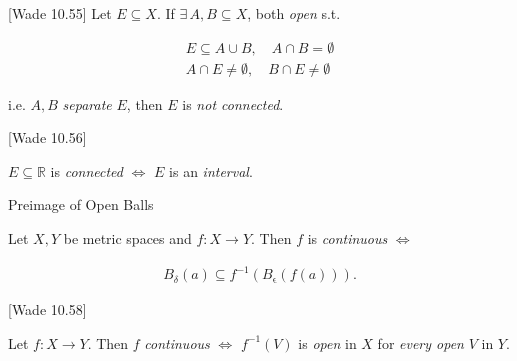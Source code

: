 \documentclass[10pt]{article} %
\newcommand{\cw}[1]{[Wade #1]}
\begin{document}
\begin{multicols}{3}
\begin{remark}{\cw{10.55}}{}
    Let $E \subseteq X$. If $\exists \, A,B \subseteq X$, both \emph{open} s.t.


        \begin{align*}
            E \subseteq A \cup B, \quad A \cap B = \emptyset \\
            A \cap E \neq \emptyset, \quad B \cap E \neq \emptyset
        \end{align*}

    i.e. $A,B$ \emph{separate} $E$, then $E$ is \emph{not connected}.

\end{remark}

\begin{theorem}{\cw{10.56}}{}

    $E \subseteq \mathbb{R}$ is \emph{connected} $\Leftrightarrow$ $E$ is an \emph{interval}.

\end{theorem}

\begin{remark}{}{Preimage of Open Balls}

    Let $X,Y$ be metric spaces and $f: X \to Y$. Then $f$ is \emph{continuous} $\Leftrightarrow$

        \begin{align*}
            B_{\delta}(a) \subseteq f^{-1}(B_{\upvarepsilon}(f(a))).
        \end{align*}

\end{remark}

\begin{theorem}{\cw{10.58}}{}

    Let $f: X \to Y$. Then $f$ \emph{continuous} $\Leftrightarrow$ $f^{-1}(V)$ is \emph{open} in $X$ for \emph{every open} $V$ in $Y$.


\end{theorem}
\end{multicols}
\end{document}
